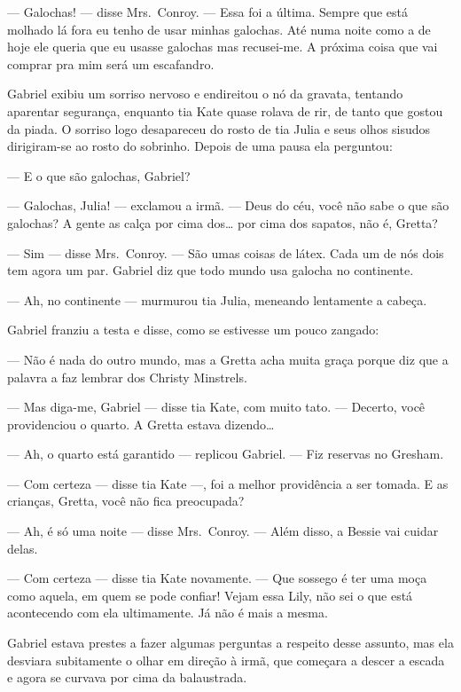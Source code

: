 --- Galochas! --- disse Mrs.~Conroy.  --- Essa foi a última.  Sempre que está
molhado lá fora eu tenho de usar minhas galochas.  Até numa noite como a de
hoje ele queria que eu usasse galochas mas recusei-me.  A próxima coisa que vai
comprar pra mim será um escafandro.

Gabriel exibiu um sorriso nervoso e endireitou o nó da gravata, tentando
aparentar segurança, enquanto tia Kate quase rolava de rir, de tanto que gostou
da piada.  O sorriso logo desapareceu do rosto de tia Julia e seus olhos
sisudos dirigiram-se ao rosto do sobrinho.  Depois de uma pausa ela perguntou:

--- E o que são galochas, Gabriel?

--- Galochas, Julia! --- exclamou a irmã.  --- Deus do céu, você não sabe o que
são galochas?  A gente as calça por cima dos\ldots{} por cima dos sapatos, não
é, Gretta?

--- Sim --- disse Mrs.~Conroy.  --- São umas coisas de látex.  Cada um de nós
dois tem agora um par.  Gabriel diz que todo mundo usa galocha no continente.

--- Ah, no continente --- murmurou tia Julia, meneando lentamente a cabeça.

Gabriel franziu a testa e disse, como se estivesse um pouco zangado:

--- Não é nada do outro mundo, mas a Gretta acha muita graça porque diz que a
palavra a faz lembrar dos Christy Minstrels.

--- Mas diga-me, Gabriel --- disse tia Kate, com muito tato.  --- Decerto, você
providenciou o quarto.  A Gretta estava dizendo\ldots{}

--- Ah, o quarto está garantido --- replicou Gabriel.  --- Fiz reservas no
Gresham.

--- Com certeza --- disse tia Kate ---, foi a melhor providência a ser tomada.
E as crianças, Gretta, você não fica preocupada?

--- Ah, é só uma noite --- disse Mrs.~Conroy.  --- Além disso, a Bessie vai
cuidar delas.

--- Com certeza --- disse tia Kate novamente.  --- Que sossego é ter uma moça
como aquela, em quem se pode confiar!  Vejam essa Lily, não sei o que está
acontecendo com ela ultimamente.  Já não é mais a mesma.

Gabriel estava prestes a fazer algumas perguntas a respeito desse assunto, mas
ela desviara subitamente o olhar em direção à irmã, que começara a descer a
escada e agora se curvava por cima da balaustrada.

